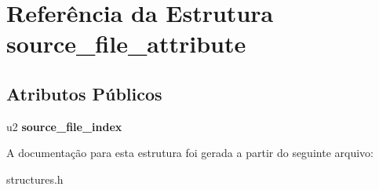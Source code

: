 \hypertarget{structsource__file__attribute}{}\section{Referência da Estrutura source\+\_\+file\+\_\+attribute}
\label{structsource__file__attribute}
\subsection*{Atributos Públicos}
\begin{DoxyCompactItemize}
\item 
\mbox{\label{structsource__file__attribute_af0056307fb509ddd8301100fd2cd84d9}} 
u2 {\bfseries source\+\_\+file\+\_\+index}
\end{DoxyCompactItemize}


A documentação para esta estrutura foi gerada a partir do seguinte arquivo\+:\begin{DoxyCompactItemize}
\item 
structures.\+h\end{DoxyCompactItemize}
